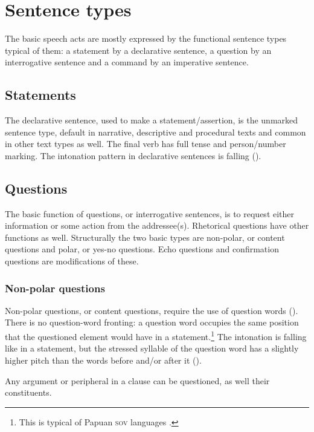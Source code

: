 
\chapter{Sentence types}
{}

The basic speech acts are mostly expressed by the functional sentence types typical of them: a statement by a declarative sentence, a question by an interrogative sentence and a command by an imperative sentence.  

\section{Statements}
{}
The declarative sentence, used to make a statement/assertion, is the unmarked sentence type, default in narrative, descriptive and procedural texts and common in other text types as well. The final verb has full tense and person/number marking. The intonation pattern in declarative sentences is falling (). 

\section{Questions} \label{sec:7.2}
{}
The basic function of questions, or interrogative sentences, is to request either information or some action from the addressee(s). Rhetorical questions have other functions as well. Structurally the two basic types are non-polar, or content questions and polar, or yes-no questions. Echo questions and confirmation questions are modifications of these. 

\subsection{Non-polar questions} \label{sec:7.2.1}
{}
Non-polar questions, or content questions, require the use of question words (). There is no question-word fronting: a question word occupies the same position that the questioned element would have in a statement.\footnote{This is typical of Papuan \textsc{sov} languages \citep[294]{Reesink1987}.} The intonation is falling like in a statement, but the stressed syllable of the question word has a slightly higher pitch than the words before and/or after it ().

Any argument or peripheral in a clause can be questioned, as well their constituents. 

